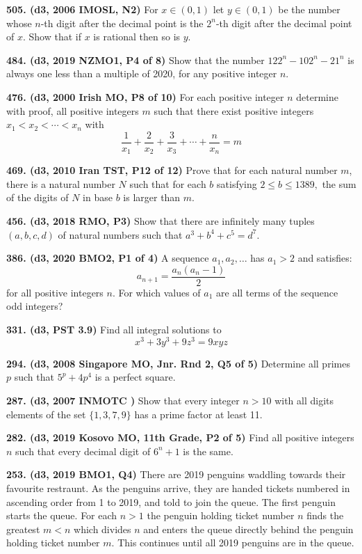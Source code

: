 \documentclass{article}
\begin{document}
\textbf{505. (\color{red}d3\color{black}, 2006 IMOSL, N2)} For $ x \in (0, 1)$ let $ y \in (0, 1)$ be the number whose $ n$-th digit after the decimal point is the $ 2^{n}$-th digit after the decimal point of $ x$. Show that if $ x$ is rational then so is $ y$.

\textbf{484. (\color{red}d3\color{black}, 2019 NZMO1, P4 of 8)} Show that the number $122^n - 102^n - 21^n$ is always one less than a multiple of 2020, for any positive integer $n$.

\textbf{476. (\color{red}d3\color{black}, 2000 Irish MO, P8 of 10)} For each positive integer $n$ determine with proof, all positive integers $m$ such that there exist positive integers $x_{1}<x_{2}<\cdots<x_{n}$ with
\[
    \frac{1}{x_{1}}+\frac{2}{x_{2}}+\frac{3}{x_{3}}+\cdots+\frac{n}{x_{n}}=m
\]

\textbf{469. (\color{red}d3\color{black}, 2010 Iran TST, P12 of 12)} Prove that for each natural number $m$, there is a natural number $N$ such that for each $b$ satisfying $2 \leq b \leq 1389,$ the sum of the digits of $N$ in base $b$ is larger than $m$.

\textbf{456. (\color{red}d3\color{black}, 2018 RMO, P3)} Show that there are infinitely many tuples $(a,b,c,d)$ of natural numbers such that $a^3 + b^4 + c^5 = d^7$.

\textbf{386. (\color{red}d3\color{black}, 2020 BMO2, P1 of 4)} A sequence $a_1, a_2, \ldots $ has $a_1 > 2$ and satisfies: $$a_{n+1} = \frac{a_n(a_n-1)}{2}$$ for all positive integers $n$. For which values of $a_1$ are all terms of the sequence odd integers?

\textbf{331. (\color{red}d3\color{black}, PST 3.9)} Find all integral solutions to \[x^3 + 3y^3 + 9z^3 = 9xyz\]

\textbf{294. (\color{red}d3\color{black}, 2008 Singapore MO, Jnr. Rnd 2, Q5 of 5)} Determine all primes $p$ such that $5^p + 4p^4$ is a perfect square.

\textbf{287. (\color{red}d3\color{black}, 2007 INMOTC )} Show that every integer $n > 10$ with all digits elements of the set $\{1, 3, 7, 9\}$ has a prime factor at least 11.

\textbf{282. (\color{red}d3\color{black}, 2019 Kosovo MO, 11th Grade, P2 of 5)} Find all positive integers $n$ such that every decimal digit of $6^n+1$ is the same.

\textbf{253. (\color{red}d3\color{black}, 2019 BMO1, Q4)} There are 2019 penguins waddling towards their favourite restraunt. As the penguins arrive, they are handed tickets numbered in ascending order from 1 to 2019, and told to join the queue. The first penguin starts the queue. For each $n > 1$ the penguin holding ticket number $n$ finds the greatest $m < n$ which divides $n$ and enters the queue directly behind the penguin holding ticket number $m$. This continues until all 2019 penguins are in the queue.
\end{document}

